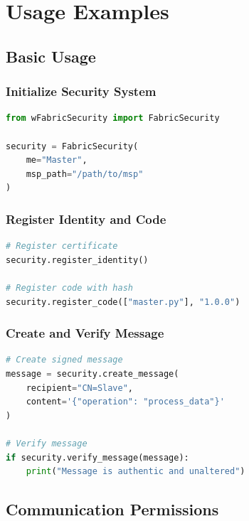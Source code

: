\documentclass[12pt,a4paper]{report}
\begin{document}
\cleardoublepage

\chapter{Usage Examples}
\cleardoublepage

\section{Basic Usage}

\subsection{Initialize Security System}

\begin{lstlisting}[language=python, caption={Initialize Security System}]
from wFabricSecurity import FabricSecurity

security = FabricSecurity(
    me="Master",
    msp_path="/path/to/msp"
)
\end{lstlisting}

\subsection{Register Identity and Code}

\begin{lstlisting}[language=python, caption={Register Identity and Code}]
# Register certificate
security.register_identity()

# Register code with hash
security.register_code(["master.py"], "1.0.0")
\end{lstlisting}

\subsection{Create and Verify Message}

\begin{lstlisting}[language=python, caption={Create and Verify Message}]
# Create signed message
message = security.create_message(
    recipient="CN=Slave",
    content='{"operation": "process_data"}'
)

# Verify message
if security.verify_message(message):
    print("Message is authentic and unaltered")
\end{lstlisting}

\section{Communication Permissions}
\end{document}

